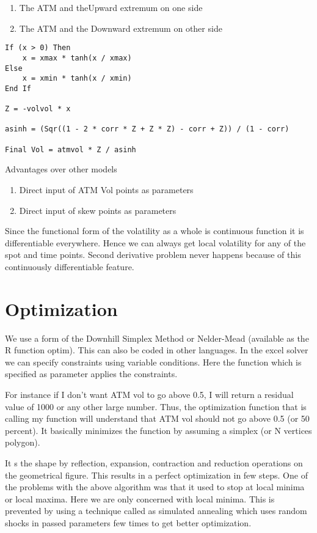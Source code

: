\documentclass[a4paper, 12pt]{article}
\begin{document}
\begin{enumerate}
\item The ATM and theUpward extremum on one side
\item The ATM and the Downward extremum on other side
\end{enumerate}

\begin{lstlisting}
If (x > 0) Then
    x = xmax * tanh(x / xmax)
Else
    x = xmin * tanh(x / xmin)
End If      

Z = -volvol * x

asinh = (Sqr((1 - 2 * corr * Z + Z * Z) - corr + Z)) / (1 - corr)

Final Vol = atmvol * Z / asinh 

\end{lstlisting}

Advantages over other models 

\begin{enumerate}
\item Direct input of ATM Vol points as parameters
\item Direct input of skew points as parameters 
\end{enumerate}

Since the functional form of the volatility as a whole is continuous function it is differentiable everywhere. Hence we can always get local volatility for any of the spot and time points. Second derivative problem never happens because of this continuously differentiable feature. 


\section{Optimization}

We use a form of the Downhill Simplex Method or Nelder-Mead (available as the R function optim). This can also be coded in other languages. In the excel solver we can specify constraints using variable conditions. Here the function which is specified as parameter applies the constraints. 
\par
For instance if I don't want ATM vol to go above 0.5, I will return a residual value of 1000 or any other large number. Thus, the optimization function that is calling my function will understand that ATM vol should not go above 0.5 (or 50 percent). It basically minimizes the function by assuming a simplex (or N vertices polygon). 
\par
It s the shape by reflection, expansion, contraction and reduction operations on the geometrical figure. This results in a perfect optimization in few steps. One of the problems with the above algorithm was that it used to stop at local minima or local maxima. Here we are only concerned with local minima. This is prevented by using a technique called as simulated annealing which uses random shocks in passed parameters few times to get better optimization. 
\end{document}
